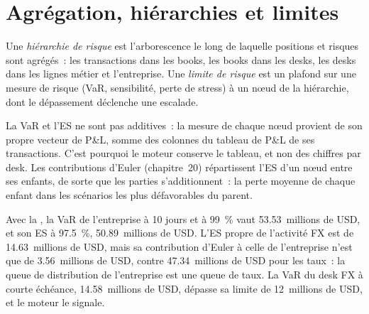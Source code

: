 \label{lst:rc:build-a-risk-engine:plan}

\section{Agrégation, hiérarchies et limites}

\begin{definition}\label{def:rc:build-a-risk-engine:hierarchy}
Une \emph{hiérarchie de risque} est l'arborescence le long de laquelle positions et risques
sont agrégés~: les transactions dans les books, les books dans les desks, les desks dans les lignes métier et l'entreprise. Une
\emph{limite de risque} est un plafond sur une mesure de risque (VaR, sensibilité, perte de stress) à un
nœud de la hiérarchie, dont le dépassement déclenche une escalade.
\end{definition}

La VaR et l'ES ne sont pas additives~: la mesure de chaque nœud provient de son propre vecteur de P\&L, somme des
colonnes du tableau de P\&L de ses transactions. C'est pourquoi le moteur conserve le tableau, et non des chiffres par desk. Les contributions d'Euler
(chapitre~20) répartissent l'ES d'un nœud entre ses enfants, de sorte que les parties s'additionnent~: la perte moyenne de chaque enfant dans les
scénarios les plus défavorables du parent.

\begin{example}\label{ex:rc:build-a-risk-engine:report}
Avec la , la VaR de l'entreprise à 10 jours et à 99~\% vaut 53.53~millions de USD, et son ES à 97.5~\%, 50.89~millions de USD.
L'ES propre de l'activité FX est de 14.63~millions de USD, mais sa contribution d'Euler à celle de l'entreprise n'est que de 3.56~millions de USD,
contre 47.34~millions de USD pour les taux~: la queue de distribution de l'entreprise est une queue de taux. La VaR du desk FX à courte échéance, 14.58~millions de USD,
dépasse sa limite de 12~millions de USD, et le moteur le signale.
\end{example}

\label{lst:rc:build-a-risk-engine:kernel}

